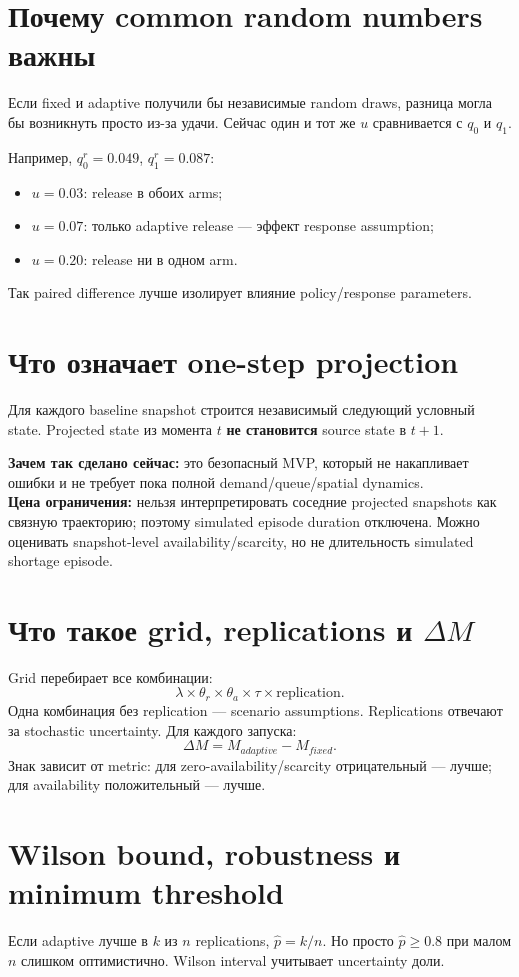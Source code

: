 \documentclass[11pt,a4paper]{article}
\begin{document}
\section{Почему common random numbers важны}
Если fixed и adaptive получили бы независимые random draws, разница могла бы возникнуть просто из-за удачи. Сейчас один и тот же $u$ сравнивается с $q_0$ и $q_1$.

Например, $q_0^r=0.049$, $q_1^r=0.087$:
\begin{itemize}
\item $u=0.03$: release в обоих arms;
\item $u=0.07$: только adaptive release --- эффект response assumption;
\item $u=0.20$: release ни в одном arm.
\end{itemize}
Так paired difference лучше изолирует влияние policy/response parameters.

\section{Что означает one-step projection}
Для каждого baseline snapshot строится независимый следующий условный state. Projected state из момента $t$ \textbf{не становится} source state в $t+1$.

\textbf{Зачем так сделано сейчас:} это безопасный MVP, который не накапливает ошибки и не требует пока полной demand/queue/spatial dynamics.\\
\textbf{Цена ограничения:} нельзя интерпретировать соседние projected snapshots как связную траекторию; поэтому simulated episode duration отключена. Можно оценивать snapshot-level availability/scarcity, но не длительность simulated shortage episode.

\section{Что такое grid, replications и $\Delta M$}
Grid перебирает все комбинации:
\[
\lambda\times\theta_r\times\theta_a\times\tau\times\text{replication}.
\]
Одна комбинация без replication --- scenario assumptions. Replications отвечают за stochastic uncertainty. Для каждого запуска:
\[
\Delta M=M_{adaptive}-M_{fixed}.
\]
Знак зависит от metric: для zero-availability/scarcity отрицательный --- лучше; для availability положительный --- лучше.

\section{Wilson bound, robustness и minimum threshold}
Если adaptive лучше в $k$ из $n$ replications, $\hat p=k/n$. Но просто $\hat p\ge0.8$ при малом $n$ слишком оптимистично. Wilson interval учитывает uncertainty доли.
\end{document}
